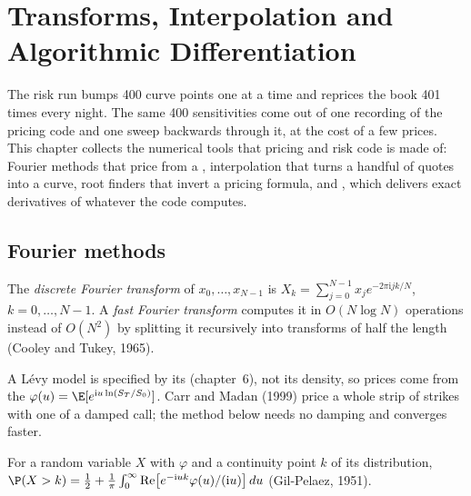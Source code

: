 \chapter{Transforms, Interpolation and Algorithmic Differentiation}\label{ch:qm:transforms-interpolation-and-algorithmic-differentiation}

The risk run bumps 400 curve points one at a time and reprices the book 401 times every night. The same 400 sensitivities come out of one recording of the pricing code and one sweep backwards
through it, at the cost of a few prices. This chapter collects the numerical tools that pricing and risk code is made of: Fourier methods that price from a , interpolation that
turns a handful of quotes into a curve, root finders that invert a pricing formula, and , which delivers exact derivatives of whatever the code computes.

\section{Fourier methods}

\begin{definition}\label{def:qm:transforms-interpolation-and-algorithmic-differentiation:dft}
The \emph{discrete Fourier transform} of $x_0, \dots, x_{N-1}$ is $X_k = \sum_{j=0}^{N-1}x_je^{-2\pi\mathrm ijk/N}$, $k = 0, \dots, N - 1$. A \emph{fast Fourier
transform} computes it in $O(N\log N)$ operations instead of $O(N^2)$ by splitting it recursively into transforms of half the length (Cooley and Tukey, 1965).
\end{definition}

A Lévy model is specified by its  (chapter~6), not its density, so prices come from the  $\varphi(u) = \E[e^{\mathrm iu\ln(S_T/S_0)}]$. Carr and Madan (1999)
price a whole strip of strikes with one  of a damped call; the method below needs no damping and converges faster.

\begin{proposition}\label{prop:qm:transforms-interpolation-and-algorithmic-differentiation:gp}
For a random variable $X$ with  $\varphi$ and a continuity point $k$ of its distribution, $\P(X > k) = \frac12 + \frac1\pi\int_0^\infty\mathrm{Re}\bigl[e^{-\mathrm iuk}\varphi(u)/(\mathrm iu)\bigr]\,du$
(Gil-Pelaez, 1951).
\end{proposition}

